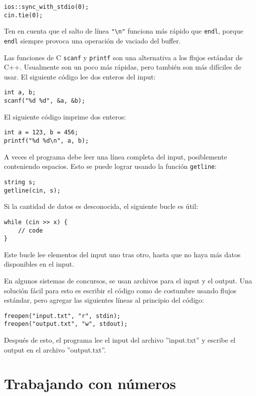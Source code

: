 \begin{lstlisting}
ios::sync_with_stdio(0);
cin.tie(0);
\end{lstlisting}

Ten en cuenta que el salto de l\'inea \texttt{"\textbackslash n"}
funciona m\'as r\'apido que \texttt{endl},
porque \texttt{endl} siempre provoca
una operaci\'on de vaciado del buffer.

Las funciones de C \texttt{scanf}
y \texttt{printf} son una alternativa
a los flujos est\'andar de C++.
Usualmente son un poco m\'as r\'apidas,
pero tambi\'en son m\'as dif\'iciles de usar.
El siguiente c\'odigo lee dos enteros del input:
\begin{lstlisting}
int a, b;
scanf("%d %d", &a, &b);
\end{lstlisting}
El siguiente c\'odigo imprime dos enteros:
\begin{lstlisting}
int a = 123, b = 456;
printf("%d %d\n", a, b);
\end{lstlisting}

A veces el programa debe leer una l\'inea completa
del input, posiblemente conteniendo espacios.
Esto se puede lograr usando la
funci\'on \texttt{getline}:

\begin{lstlisting}
string s;
getline(cin, s);
\end{lstlisting}

Si la cantidad de datos es desconocida, el siguiente
bucle es \'util:
\begin{lstlisting}
while (cin >> x) {
    // code
}
\end{lstlisting}
Este bucle lee elementos del input
uno tras otro, hasta que no haya m\'as
datos disponibles en el input.

En algunos sistemas de concursos, se usan archivos para
el input y el output.
Una soluci\'on f\'acil para esto es escribir
el c\'odigo como de costumbre usando flujos est\'andar,
pero agregar las siguientes l\'ineas al principio del c\'odigo:
\begin{lstlisting}
freopen("input.txt", "r", stdin);
freopen("output.txt", "w", stdout);
\end{lstlisting}
Despu\'es de esto, el programa lee el input del archivo
''input.txt'' y escribe el output en el archivo
''output.txt''.

\section{Trabajando con n\'umeros}

